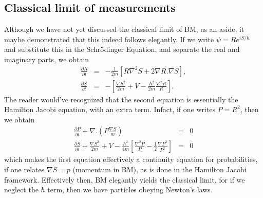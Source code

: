 \subsection{Classical limit of measurements}

Although we have not yet discussed the classical limit of BM, as an
aside, it maybe demonstrated that this indeed follows elegantly. If
we write $\psi=Re^{iS/\hbar}$ and substitute this in the Schr\"odinger
Equation, and separate the real and imaginary parts, we obtain 
\begin{eqnarray*}
\frac{\partial R}{\partial t} & = & -\frac{1}{2m}\left[R\nabla^{2}S+2\nabla R.\nabla S\right],\\
\frac{\partial S}{\partial t} & = & -\left[\frac{\nabla S^{2}}{2m}+V-\frac{\hbar^{2}}{2m}\frac{\nabla^{2}R}{R}\right].
\end{eqnarray*}
The reader would've recognized that the second equation is essentially
the Hamilton Jacobi equation, with an extra term. Infact, if one writes
$P=R^{2}$, then we obtain 
\begin{eqnarray*}
\frac{\partial P}{\partial t}+\nabla.\left(P\frac{\nabla S}{m}\right) & = & 0\\
\frac{\partial S}{\partial t}+\frac{\nabla S^{2}}{2m}+V-\frac{\hbar^{2}}{4m}\left[\frac{\nabla^{2}P}{P}-\frac{1}{2}\frac{\nabla P^{2}}{P^{2}}\right] & = & 0
\end{eqnarray*}
which makes the first equation effectively a continuity equation for
probabilities, if one relates $\nabla S=p$ (momentum in BM), as is
done in the Hamilton Jacobi framework. Effectively then, BM elegantly
yields the classical limit, for if we neglect the $\hbar$ term, then
we have particles obeying Newton's laws. 

